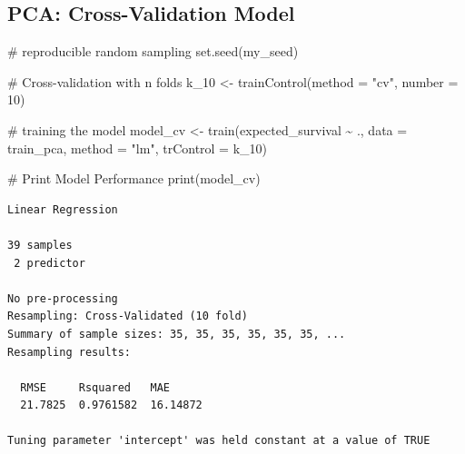 \documentclass[
  letterpaper,
  DIV=11,
  numbers=noendperiod]{scrreprt}
\newenvironment{Shaded}{\begin{snugshade}}{\end{snugshade}}
\newcommand{\AttributeTok}[1]{\textcolor[rgb]{0.40,0.45,0.13}{#1}}
\newcommand{\CommentTok}[1]{\textcolor[rgb]{0.37,0.37,0.37}{#1}}
\newcommand{\DecValTok}[1]{\textcolor[rgb]{0.68,0.00,0.00}{#1}}
\newcommand{\FunctionTok}[1]{\textcolor[rgb]{0.28,0.35,0.67}{#1}}
\newcommand{\NormalTok}[1]{\textcolor[rgb]{0.00,0.23,0.31}{#1}}
\newcommand{\OtherTok}[1]{\textcolor[rgb]{0.00,0.23,0.31}{#1}}
\newcommand{\SpecialCharTok}[1]{\textcolor[rgb]{0.37,0.37,0.37}{#1}}
\newcommand{\StringTok}[1]{\textcolor[rgb]{0.13,0.47,0.30}{#1}}
\begin{document}
\hypertarget{pca-cross-validation-model}{%
\subsection{PCA: Cross-Validation
Model}\label{pca-cross-validation-model}}

\begin{Shaded}
\begin{Highlighting}[]
\CommentTok{\# reproducible random sampling}
\FunctionTok{set.seed}\NormalTok{(my\_seed)}

\CommentTok{\# Cross{-}validation with n folds}
\NormalTok{k\_10 }\OtherTok{\textless{}{-}} \FunctionTok{trainControl}\NormalTok{(}\AttributeTok{method =} \StringTok{"cv"}\NormalTok{, }\AttributeTok{number =} \DecValTok{10}\NormalTok{)}

\CommentTok{\# training the model }
\NormalTok{model\_cv }\OtherTok{\textless{}{-}} \FunctionTok{train}\NormalTok{(expected\_survival }\SpecialCharTok{\textasciitilde{}}\NormalTok{ ., }
                  \AttributeTok{data =}\NormalTok{ train\_pca,}
                  \AttributeTok{method =} \StringTok{"lm"}\NormalTok{,}
                  \AttributeTok{trControl =}\NormalTok{ k\_10)}

\CommentTok{\# Print Model Performance}
\FunctionTok{print}\NormalTok{(model\_cv)}
\end{Highlighting}
\end{Shaded}

\begin{verbatim}
Linear Regression 

39 samples
 2 predictor

No pre-processing
Resampling: Cross-Validated (10 fold) 
Summary of sample sizes: 35, 35, 35, 35, 35, 35, ... 
Resampling results:

  RMSE     Rsquared   MAE     
  21.7825  0.9761582  16.14872

Tuning parameter 'intercept' was held constant at a value of TRUE
\end{verbatim}

\begin{Shaded}
\end{Shaded}
\end{document}
